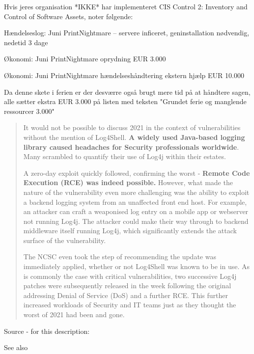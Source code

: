 \documentclass[Screen16to9,17pt]{foils}
\begin{document}
Hvis jeres organisation *IKKE* har implementeret CIS Control 2: Inventory and Control of Software Assets, noter følgende:
\begin{list2}
\item Hændelseslog: Juni PrintNightmare -- servere inficeret, geninstallation nødvendig, nedetid 3 dage
\item Økonomi: Juni PrintNightmare oprydning EUR 3.000
\item Økonomi: Juni PrintNightmare hændelseshåndtering ekstern hjælp EUR 10.000
\end{list2}

Da denne skete i ferien er der desværre også brugt mere tid på at håndtere sagen, alle sætter ekstra EUR 3.000 på listen med teksten "Grundet ferie og manglende ressourcer 3.000"



\begin{quote}\small
It would not be possible to discuss 2021 in the context of vulnerabilities without the mention of Log4Shell. {\bf A widely used Java-based logging library caused headaches for Security professionals worldwide}. Many scrambled to quantify their use of Log4j within their estates.

A zero-day exploit quickly followed, confirming the worst - {\bf Remote Code Execution (RCE) was indeed possible.} However, what made the nature of the vulnerability even more challenging was the ability to exploit a backend logging system from an unaffected front end host. For example, an attacker can craft a weaponised log entry on a mobile app or webserver not running Log4j. The attacker could make their way through to backend middleware itself running Log4j, which significantly extends the attack surface of the vulnerability.

The NCSC even took the step of recommending the update was immediately applied, whether or not Log4Shell was known to be in use. As is commonly the case with critical vulnerabilities, two successive Log4j patches were subsequently released in the week following the original addressing Denial of Service (DoS) and a further RCE. This further increased workloads of Security and IT teams just as they thought the worst of 2021 had been and gone.
\end{quote}
Source - for this description:\\

See also 
\end{document}
